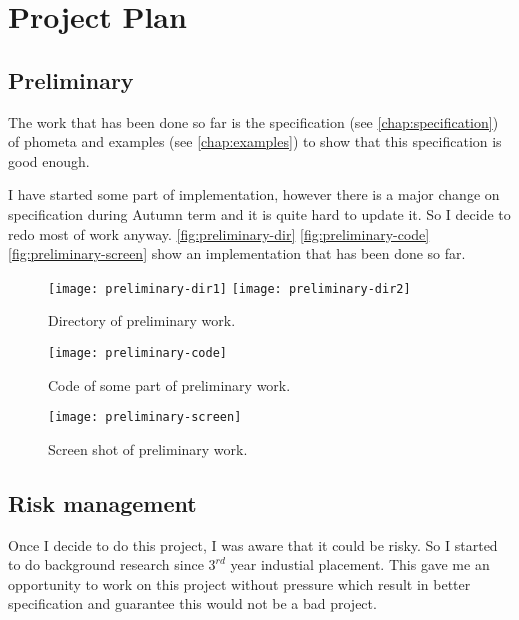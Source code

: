 \documentclass[master.tex]{subfiles}
\begin{document}
\chapter{Project Plan}

\section{Preliminary}

The work that has been done so far is the specification (see \autoref{chap:specification}) of phometa and examples (see \autoref{chap:examples}) to show that this specification is good enough.

I have started some part of implementation, however there is a major change on specification during Autumn term and it is quite hard to update it. So I decide to redo most of work anyway. \autoref{fig:preliminary-dir} \autoref{fig:preliminary-code} \autoref{fig:preliminary-screen} show an implementation that has been done so far.

\begin{figure}[H]
    \centering
    \texttt{[image: preliminary-dir1]}
    \hspace{1cm}
    \texttt{[image: preliminary-dir2]}
    \caption{Directory of preliminary work.}
\label{fig:preliminary-dir}
\end{figure}

\begin{figure}[H]
    \centering
    \texttt{[image: preliminary-code]}
    \caption{Code of some part of preliminary work.}
\label{fig:preliminary-code}
\end{figure}

\begin{figure}[H]
    \centering
    \texttt{[image: preliminary-screen]}
    \caption{Screen shot of preliminary work.}
\label{fig:preliminary-screen}
\end{figure}

\section{Risk management}
Once I decide to do this project, I was aware that it could be risky. So I started to do background research since $3^{rd}$ year industial placement. This gave me an opportunity to work on this project without pressure which result in better specification and guarantee this would not be a bad project.
\end{document}
